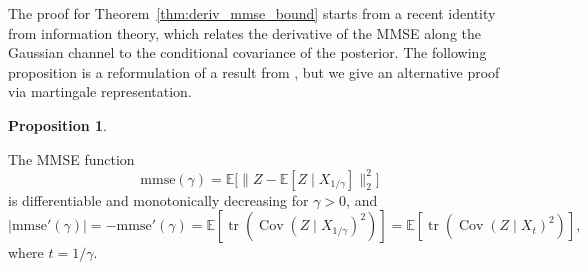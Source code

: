 \documentclass[11pt]{article}
\theoremstyle{definition}
\newtheorem{proposition}{Proposition}
\numberwithin{equation}{section}
\begin{document}
The proof for Theorem~\ref{thm:deriv_mmse_bound} starts from a recent identity from information theory, which relates the derivative of the MMSE along the Gaussian channel to the conditional covariance of the posterior. The following proposition is a reformulation of a result from \cite{nguyen2024beyond}, but we give an alternative proof via martingale representation.


\begin{proposition}
\label{prop:mmse-deriv-cov}

The MMSE function
\[
\mathrm{mmse}(\gamma)=\mathbb E\big[\|Z-\mathbb E[Z\mid X_{1/\gamma}]\|_2^2\big]
\]
is differentiable and monotonically decreasing for $\gamma>0$, and
\begin{equation}
|\mathrm{mmse}'(\gamma)|
=-\mathrm{mmse}'(\gamma)
=\mathbb E\!\left[
\operatorname{tr}\!\left(\operatorname{Cov}(Z\mid X_{1/\gamma})^2\right)
\right]
=\mathbb E\!\left[
\operatorname{tr}\!\left(\operatorname{Cov}(Z\mid X_t)^2\right)
\right],
\label{eq:mmse-deriv-cov}
\end{equation}
where $t=1/\gamma$.
\end{proposition}
\end{document}
